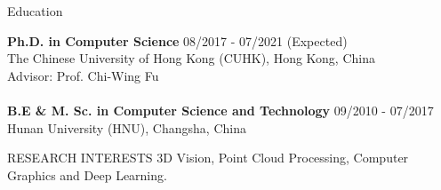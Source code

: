 \documentclass[UTF8]{cv} %
\begin{document}

\begin{rSection}{Education}

{\bf Ph.D. in Computer Science} \hfill {08/2017 - 07/2021 (Expected)}
\\ The Chinese University of Hong Kong (CUHK), Hong Kong, China
\\ Advisor: Prof. Chi-Wing Fu\\
\\{\bf B.E \& M. Sc. in Computer Science and Technology} \hfill {09/2010 - 07/2017}
\\ Hunan University (HNU), Changsha, China 



\end{rSection}

\begin{rSection}{RESEARCH INTERESTS}
3D Vision, Point Cloud Processing, Computer Graphics and Deep Learning.
\end{rSection}
\end{document}
